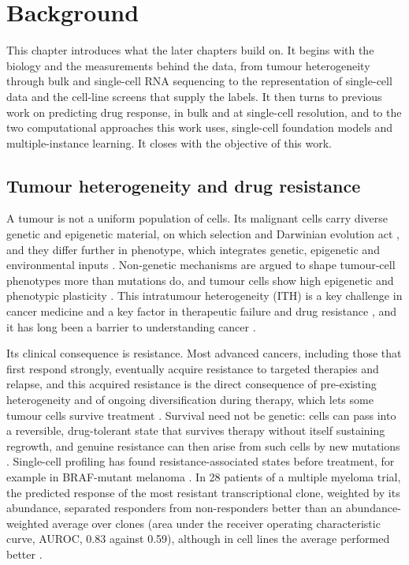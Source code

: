 \chapter{Background}
\label{sec:background}

This chapter introduces what the later chapters build on. It begins with the biology and the
measurements behind the data, from tumour heterogeneity through bulk and single-cell RNA sequencing to
the representation of single-cell data and the cell-line screens that supply the labels. It then turns
to previous work on predicting drug response, in bulk and at single-cell resolution, and to the two
computational approaches this work uses, single-cell foundation models and multiple-instance learning.
It closes with the objective of this work.

\section{Tumour heterogeneity and drug resistance}
\label{sec:bg-heterogeneity}

A tumour is not a uniform population of cells. Its malignant cells carry diverse genetic and epigenetic
material, on which selection and Darwinian evolution act \cite{mcgranahan2017}, and they differ further in
phenotype, which integrates genetic, epigenetic and environmental inputs \cite{marusyk2020}. Non-genetic mechanisms are
argued to shape tumour-cell phenotypes more than mutations do, and tumour cells show high epigenetic and
phenotypic plasticity \cite{marusyk2020}. This intratumour heterogeneity (ITH) is a key challenge in
cancer medicine and a key factor in therapeutic failure and drug resistance \cite{mcgranahan2017}, and it
has long been a barrier to understanding cancer \cite{castro2021}.

Its clinical consequence is resistance. Most advanced cancers, including those that first respond
strongly, eventually acquire resistance to targeted therapies and relapse, and this acquired resistance
is the direct consequence of pre-existing heterogeneity and of ongoing diversification during therapy,
which lets some tumour cells survive treatment \cite{marusyk2020}. Survival need not be genetic: cells can
pass into a reversible, drug-tolerant state that survives therapy without itself sustaining regrowth, and
genuine resistance can then arise from such cells by new mutations \cite{marusyk2020}. Single-cell
profiling has found resistance-associated states before treatment, for example in BRAF-mutant melanoma
\cite{castro2021}. In 28 patients of a multiple myeloma trial, the predicted response of the most
resistant transcriptional clone, weighted by its abundance, separated responders from non-responders
better than an abundance-weighted average over clones (area under the receiver operating characteristic
curve, AUROC, 0.83 against 0.59), although in cell lines the average performed better \cite{perception}.

